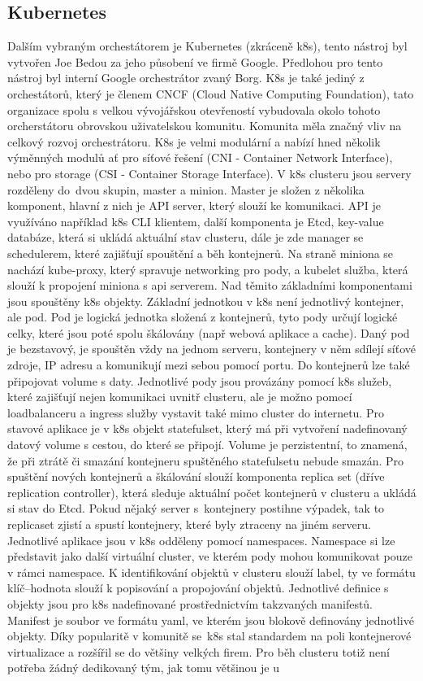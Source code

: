 \subsection{Kubernetes}
Dalším vybraným orchestátorem je Kubernetes (zkráceně k8s), tento nástroj byl vytvořen Joe Bedou \cite{k8s_beda_commit} za jeho působení ve firmě Google. Předlohou pro tento nástroj byl interní Google orchestrátor zvaný Borg. K8s je také jediný z orchestátorů, který je členem CNCF (Cloud Native Computing Foundation), tato organizace spolu s velkou vývojářskou otevřeností vybudovala okolo tohoto orcherstátoru obrovskou uživatelskou komunitu. Komunita měla značný vliv na celkový rozvoj orchestrátoru. K8s je velmi modulární a nabízí hned několik výměnných modulů ať pro síťové řešení (CNI - Container Network Interface), nebo pro storage (CSI - Container Storage Interface). V k8s clusteru jsou servery rozděleny do dvou skupin, master a minion. Master je složen z několika komponent, hlavní z nich je API server, který slouží ke komunikaci. API je využíváno například k8s CLI klientem, další komponenta je Etcd, key-value databáze, která si ukládá aktuální stav clusteru, dále je zde manager se schedulerem, které zajišťují spouštění a běh kontejnerů. Na straně miniona se nachází kube-proxy, který spravuje networking pro pody, a kubelet služba, která slouží k propojení miniona s api serverem. Nad těmito základními komponentami jsou spouštěny k8s objekty. Základní jednotkou v k8s není jednotlivý kontejner, ale pod. Pod je logická jednotka složená z kontejnerů, tyto pody určují logické celky, které jsou poté spolu škálovány (např webová aplikace a cache). Daný pod je bezstavový, je spouštěn vždy na jednom serveru, kontejnery v něm sdílejí síťové zdroje, IP adresu a komunikují mezi sebou pomocí portu. Do kontejnerů lze také připojovat volume s daty. Jednotlivé pody jsou provázány pomocí k8s služeb, které zajišťují nejen komunikaci uvnitř clusteru, ale je možno pomocí loadbalanceru a ingress služby vystavit také mimo cluster do internetu. Pro stavové aplikace je v k8s objekt statefulset, který má při vytvoření nadefinovaný datový volume s cestou, do které se připojí. Volume je perzistentní, to znamená, že při ztrátě či smazání kontejneru spuštěného statefulsetu nebude smazán. Pro spuštění nových kontejnerů a škálování slouží komponenta replica set (dříve replication controller), která sleduje aktuální počet kontejnerů v clusteru a ukládá si stav do Etcd. Pokud nějaký server s kontejnery postihne výpadek, tak to replicaset zjistí a spustí kontejnery, které byly ztraceny na jiném serveru. Jednotlivé aplikace jsou v k8s odděleny pomocí namespaces. Namespace si lze představit jako další virtuální cluster, ve kterém pody mohou komunikovat pouze v rámci namespace. K identifikování objektů v clusteru slouží label, ty ve formátu klíč–hodnota slouží k popisování a propojování objektů. Jednotlivé definice s objekty jsou pro k8s nadefinované prostřednictvím takzvaných manifestů. Manifest je soubor ve formátu yaml, ve kterém jsou blokově definovány jednotlivé objekty. Díky popularitě v komunitě se k8s stal standardem na poli kontejnerové virtualizace a rozšířil se do většiny velkých firem. Pro běh clusteru totiž není potřeba žádný dedikovaný tým, jak tomu většinou je u 
